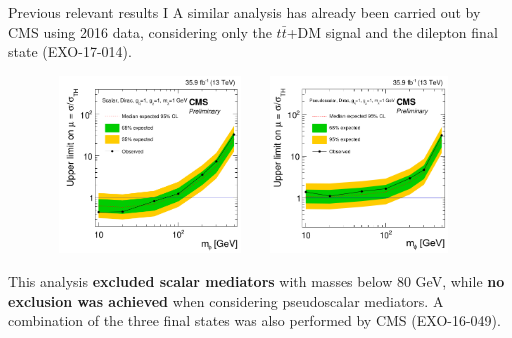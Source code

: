 \documentclass[8pt]{beamer}
\begin{document}
\begin{frame}{Previous relevant results I}
\justifying
\vspace{5pt}
A \alert{similar analysis has already been carried out by CMS} using 2016 data, considering only the $t \bar t$+DM signal and the dilepton final state (EXO-17-014). \vfill %


\begin{figure}[htbp]
\centering
\begin{minipage}[b]{.49\textwidth}
\includegraphics[width=5.4cm, height=4.7cm]{figs/Juan_S.png}
\end{minipage}\hfill
\begin{minipage}[b]{.49\textwidth}
\includegraphics[width=5.4cm, height=4.7cm]{figs/Juan_PS.png}
\end{minipage}\hfill
\label{fig:Juan}
\end{figure}

This analysis \textbf{excluded scalar mediators} with masses below 80 GeV, while \textbf{no exclusion was achieved} when considering pseudoscalar mediators. \vfill
A \alert{combination of the three final states} was also performed by CMS (EXO-16-049). \vfill

\end{frame}
\end{document}
